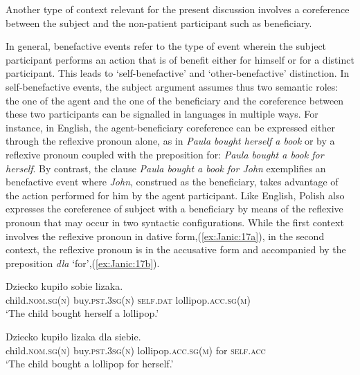\documentclass[output=paper]{langscibook}
\begin{document}
Another type of context relevant for the present discussion involves a coreference between the subject and the non-patient participant such as beneficiary. 

In general, benefactive events refer to the type of event wherein the subject participant performs an action that is of benefit either for himself or for a distinct participant. This leads to ‘self-benefactive’ and ‘other-benefactive’ distinction. In self-benefactive events, the subject argument assumes thus two semantic roles: the one of the agent and the one of the beneficiary and the coreference between these two participants can be signalled in languages in multiple ways. For instance, in English, the agent-beneficiary coreference can be expressed either through the reflexive pronoun alone, as in \textit{Paula bought herself a book} or by a reflexive pronoun coupled with the preposition for: \textit{Paula bought a book for herself}. By contrast, the clause \textit{Paula bought a book for John} exemplifies an benefactive event where \textit{John}, construed as the beneficiary, takes advantage of the action performed for him by the agent participant. Like English, Polish also expresses the coreference of subject with a beneficiary by means of the reflexive pronoun that may occur in two syntactic configurations. While the first context involves the reflexive pronoun in dative form,(\ref{ex:Janic:17a}), in the second context, the reflexive pronoun is in the accusative form and accompanied by the preposition \textit{dla} ‘for’,(\ref{ex:Janic:17b}). 

\ea \label{ex:Janic:17}
\ea \label{ex:Janic:17a}
\gll Dziecko	 kupiło		 sobie		 lizaka.\\
		child.\textsc{nom.sg(n)}	buy.\textsc{pst.3sg(n)}	\textsc{self.dat}	lollipop.\textsc{acc.sg(m)}\\
\glt ‘The child bought herself a lollipop.’

\ex \label{ex:Janic:17b}
\gll Dziecko	 kupiło		 lizaka			 dla	 siebie.\\
	 child.\textsc{nom.sg(n)}	buy.\textsc{pst.3sg(n)}	lollipop.\textsc{acc.sg(m)}	for	 \textsc{self.acc}\\	
\glt ‘The child bought a lollipop for herself.’	
\z 
\z
	 
\end{document}
